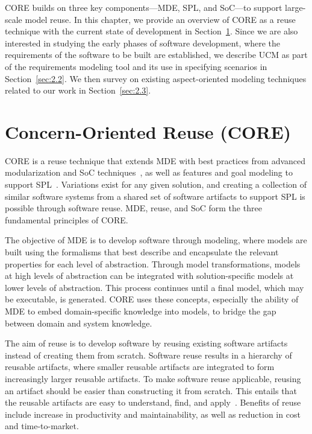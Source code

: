 

CORE builds on three key components---MDE, SPL, and SoC---to support large-scale model reuse. In this chapter, we provide an overview of CORE as a reuse technique with the current state of development in Section~\ref{sec:2.1}. Since we are also interested in studying the early phases of software development, where the requirements of the software to be built are established, we describe UCM as part of the requirements modeling tool and its use in specifying scenarios in Section~\ref{sec:2.2}. We then survey on existing aspect-oriented modeling techniques related to our work in Section~\ref{sec:2.3}.

\section{Concern-Oriented Reuse (CORE)} \label{sec:2.1}

CORE is a reuse technique that extends MDE with best practices from advanced modularization and SoC techniques~\cite{dijkstra1976discipline}, as well as features and goal modeling to support SPL~\cite{pohl2005software}. Variations exist for any given solution, and creating a collection of similar software systems from a shared set of software artifacts to support SPL is possible through software reuse. MDE, reuse, and SoC form the three fundamental principles of CORE.

The objective of MDE is to develop software through modeling, where models are built using the formalisms that best describe and encapsulate the relevant properties for each level of abstraction. Through model transformations, models at high levels of abstraction can be integrated with solution-specific models at lower levels of abstraction. This process continues until a final model, which may be executable, is generated. CORE uses these concepts, especially the ability of MDE to embed domain-specific knowledge into models, to bridge the gap between domain and system knowledge.

The aim of reuse is to develop software by reusing existing software artifacts instead of creating them from scratch. Software reuse results in a hierarchy of reusable artifacts, where smaller reusable artifacts are integrated to form increasingly larger reusable artifacts. To make software reuse applicable, reusing an artifact should be easier than constructing it from scratch. This entails that the reusable artifacts are easy to understand, find, and apply~\cite{coulange2012software, krueger1992software}. Benefits of reuse include increase in productivity and maintainability, as well as reduction in cost and time-to-market.

